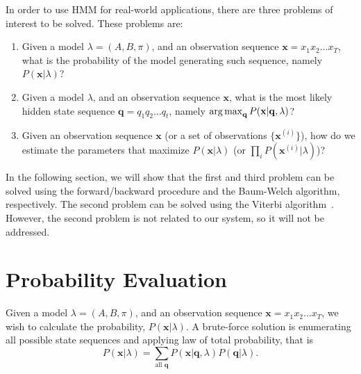 \documentclass[12pt,final,twoside]{report}
\begin{document}
In order to use HMM for real-world applications, there are three problems of interest to be solved. These problems are:
\begin{enumerate}
  \item Given a model $\lambda=(A, B, \pi)$, and an observation sequence $\mathbf{x} = x_1 x_2 \dots x_T$, what is the probability of the model generating such sequence, namely $P(\mathbf{x}|\lambda)$?
  \item Given a model $\lambda$, and an observation sequence $\mathbf{x}$, what is the most likely hidden state sequence $\mathbf{q} = q_1 q_2 \dots q_t$, namely $\operatorname*{arg\,max}_{\mathbf{q}}P(\mathbf{x}|\mathbf{q},\lambda)$?
  \item Given an observation sequence $\mathbf{x}$ (or a set of observations $\{\mathbf{x}^{(i)}\}$), how do we estimate the parameters that maximize $P(\mathbf{x}|\lambda)$ (or $\prod_{i} P(\mathbf{x}^{(i)}|\lambda) $)?
\end{enumerate}

In the following section, we will show that the first and third problem can be solved using the forward/backward procedure and the Baum-Welch algorithm, respectively. The second problem can be solved using the Viterbi algorithm~\cite{forney_viterbi_1973}. However, the second problem is not related to our system, so it will not be addressed.

\section{Probability Evaluation}
Given a model $\lambda=(A, B, \pi)$, and an observation sequence $\mathbf{x} = x_1 x_2 \dots x_T$, we wish to calculate the probability, $P(\mathbf{x}|\lambda)$. A brute-force solution is enumerating all possible state sequences and applying law of total probability, that is
\begin{equation}
  P(\mathbf{x}|\lambda) = \sum_{\text{all } \mathbf{q}} P(\mathbf{x}|\mathbf{q},\lambda) P(\mathbf{q}|\lambda) .
\end{equation}
\end{document}
